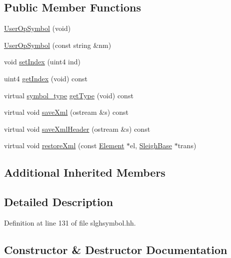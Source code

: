 \subsection*{Public Member Functions}
\begin{DoxyCompactItemize}
\item 
\mbox{\hyperlink{class_user_op_symbol_a9f762513c5d67848383f04188d3f5eec}{User\+Op\+Symbol}} (void)
\item 
\mbox{\hyperlink{class_user_op_symbol_a04e8200caa0225befbcddce9e9361047}{User\+Op\+Symbol}} (const string \&nm)
\item 
void \mbox{\hyperlink{class_user_op_symbol_a7a2c2ff33ed1eb44a58e0774aa5d8f7e}{set\+Index}} (uint4 ind)
\item 
uint4 \mbox{\hyperlink{class_user_op_symbol_ab62b03a3cb7d7dce34edc8f598b90700}{get\+Index}} (void) const
\item 
virtual \mbox{\hyperlink{class_sleigh_symbol_aba70f7f332fd63488c5ec4bd7807db41}{symbol\+\_\+type}} \mbox{\hyperlink{class_user_op_symbol_a1a7a884e2e3317f5c756dfc848d1e1c0}{get\+Type}} (void) const
\item 
virtual void \mbox{\hyperlink{class_user_op_symbol_a51162d8d46fb1d515d65a5b56d2864d4}{save\+Xml}} (ostream \&s) const
\item 
virtual void \mbox{\hyperlink{class_user_op_symbol_ae799003f975f31055383301b15c6cf0f}{save\+Xml\+Header}} (ostream \&s) const
\item 
virtual void \mbox{\hyperlink{class_user_op_symbol_a96b0bf7c65b30f21307b156bf13bc1a7}{restore\+Xml}} (const \mbox{\hyperlink{class_element}{Element}} $\ast$el, \mbox{\hyperlink{class_sleigh_base}{Sleigh\+Base}} $\ast$trans)
\end{DoxyCompactItemize}
\subsection*{Additional Inherited Members}


\subsection{Detailed Description}


Definition at line 131 of file slghsymbol.\+hh.



\subsection{Constructor \& Destructor Documentation}
\mbox{\label{class_user_op_symbol_a9f762513c5d67848383f04188d3f5eec}} 
